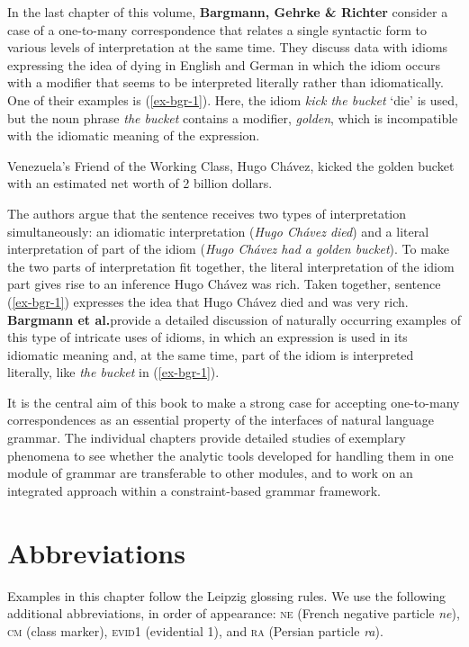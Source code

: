 \documentclass[output=paper]{langscibook}
\begin{document}
In the last chapter of this volume,
\textbf{Bargmann, Gehrke \& Richter} consider a case of a one-to-many
correspondence that relates a single syntactic form to various levels
of interpretation at the same time.  They discuss data with idioms
expressing the idea of dying in English and German in which the idiom
occurs with a modifier that seems to be interpreted literally rather
than idiomatically.  One of their examples is (\ref{ex-bgr-1}). Here,
the idiom \textit{kick the bucket} `die' is used, but the noun phrase
\textit{the bucket} contains a modifier, \textit{golden}, which is
incompatible with the idiomatic meaning of the expression.

\ea \label{ex-bgr-1}
Venezuela’s Friend of the Working Class, Hugo Chávez, kicked the golden
bucket with an estimated net worth of 2 billion dollars.
\z

The authors argue that the sentence receives two types of
interpretation simultaneously: an idiomatic interpretation
(\textit{Hugo Chávez died}) and a literal interpretation of part of
the idiom (\textit{Hugo Chávez had a golden bucket}).  To make the two
parts of interpretation fit together, the literal interpretation of
the idiom part gives rise to an inference Hugo Chávez was rich.  Taken
together, sentence (\ref{ex-bgr-1}) expresses the idea that Hugo
Chávez died and was very rich.  \textbf{Bargmann et al.}\@ provide a
detailed discussion of naturally occurring examples of this type of
intricate uses of idioms, in which an expression is used in its
idiomatic meaning and, at the same time, part of the idiom is
interpreted literally, like \textit{the bucket} in (\ref{ex-bgr-1}).


It is the central aim of this book to make a strong case for accepting
one-to-many correspondences as an essential property of the interfaces
of natural language grammar. The individual chapters provide detailed
studies of exemplary phenomena to see whether the analytic tools
developed for handling them in one module of grammar are transferable
to other modules, and to work on an integrated approach within a
constraint-based grammar framework.

\section*{Abbreviations}

Examples in this chapter follow the Leipzig glossing rules. We use the
following additional abbreviations, in order of appearance:
\textsc{ne} (French negative particle \textit{ne}), \textsc{cm} (class
marker), \textsc{evid1} (evidential 1), and \textsc{ra} (Persian
particle \textit{ra}).
\end{document}

